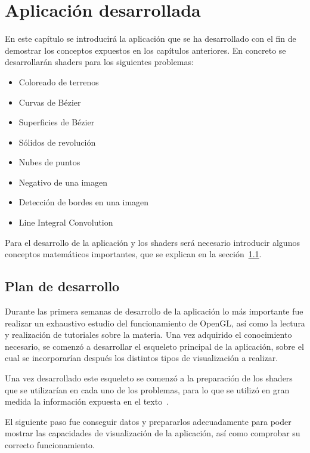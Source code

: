 \cleardoublepage

\chapter{Aplicación desarrollada}
\label{makereference5}

En este capítulo se introducirá la aplicación que se ha desarrollado con el
fin de demostrar los conceptos expuestos en los capítulos anteriores. En
concreto se desarrollarán shaders para los siguientes problemas:

\begin{itemize}
		\item Coloreado de terrenos
		\item Curvas de Bézier
		\item Superficies de Bézier
		\item Sólidos de revolución
		\item Nubes de puntos
		\item Negativo de una imagen
		\item Detección de bordes en una imagen
		\item Line Integral Convolution
\end{itemize}

Para el desarrollo de la aplicación y los shaders será necesario introducir
algunos conceptos matemáticos importantes, que se explican en la
sección~\ref{makereference5.1}.

\section{Plan de desarrollo}
\label{makereference5.1}

Durante las primera semanas de desarrollo de la aplicación lo más importante fue
realizar un exhaustivo estudio del funcionamiento de OpenGL, así como la lectura
y realización de tutoriales sobre la materia. Una vez adquirido el conocimiento
necesario, se comenzó a desarrollar el esqueleto principal de la aplicación,
sobre el cual se incorporarían después los distintos tipos de visualización a
realizar.

Una vez desarrollado este esqueleto se comenzó a la preparación de los shaders
que se utilizarían en cada uno de los problemas, para lo que se utilizó en gran
medida la información expuesta en el texto~\citet{Bailey}.

El siguiente paso fue conseguir datos y prepararlos adecuadamente para poder
mostrar las capacidades de visualización de la aplicación, así como comprobar su
correcto funcionamiento.

